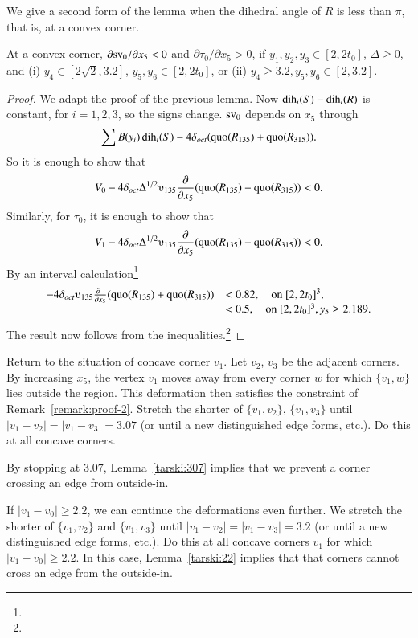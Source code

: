 We give a second form of the lemma when the dihedral angle of $R$ is
less than $\pi$, that is, at a convex corner.


\begin{lemma}
At a convex corner, $\partial {\operatorname{sv}}_0/\partial x_5 <0$ and
    $\partial \tau_0/\partial x_5>0$, if $y_1,y_2,y_3\in[2,2t_0]$,
$\Delta\ge0$, and (i) $y_4\in[2\sqrt{2},3.2]$, $y_5,y_6\in[2,2t_0]$, or
(ii) $y_4\ge 3.2, y_5,y_6\in[2,3.2]$.
\end{lemma}

\begin{proof}
We adapt the proof of the previous lemma.  Now
$\operatorname{dih}_i(S)-\operatorname{dih}_i(R)$ is constant, for $i=1,2,3$, so the signs change.
${\operatorname{sv}}_0$ depends on $x_5$ through
$$\sum B(y_i)\operatorname{dih}_i(S) - 4\delta_{oct} (\operatorname{quo}(R_{135})+\operatorname{quo}(R_{315})).$$
So it is enough to show that
    $$
    V_0 - 4\doct\Delta^{1/2}\ups_{135}\frac{\partial}{\partial x_5}
    (\quo(R_{135})+\quo(R_{315}))<0.
    $$
Similarly, for $\tau_0$, it is enough to show that
    $$
        V_1 - 4\doct\Delta^{1/2}\ups_{135}\frac{\partial}{\partial x_5}
    (\quo(R_{135})+\quo(R_{315}))<0.
    $$
By an interval calculation\footnote{} %
    $$
    \begin{array}{lll}
    -4\doct  \ups_{135}\frac{\partial\phantom{x}}{\partial x_5}
    (\quo(R_{135})+\quo(R_{315}))&< 0.82,\quad\hbox{on } [2,2t_0]^3,\\
                            &<0.5,\quad\hbox{on }[2,2t_0]^3, y_5\ge2.189.
    \end{array}
    $$
The result now follows from
the inequalities.\footnote{} %
\end{proof}

Return to the situation of concave corner $v_1$. Let $v_2$, $v_3$ be the
adjacent corners. By increasing $x_5$, the vertex $v_1$ moves away from
every corner $w$ for which $\{v_1,w\}$ lies outside the region.  This
deformation then satisfies the constraint of
Remark~\ref{remark:proof-2}. Stretch the shorter of $\{v_1,v_2\}$,
$\{v_1,v_3\}$ until $|v_1-v_2|=|v_1-v_3|=3.07$ (or until a new
distinguished edge forms, etc.).  Do this at all concave corners.

By stopping at $3.07$, Lemma~\ref{tarski:307} implies that we prevent a corner crossing an edge from
outside-in. 

If $|v_1-v_0|\ge2.2$, we can continue the deformations even further. We
stretch the shorter of $\{v_1,v_2\}$ and $\{v_1,v_3\}$ until
$|v_1-v_2|=|v_1-v_3|=3.2$ (or until a new distinguished edge forms,
etc.).  Do this at all concave corners $v_1$ for which $|v_1-v_0|\ge2.2$.  In this case, Lemma~\ref{tarski:22} implies that that corners cannot cross an edge from the outside-in.







